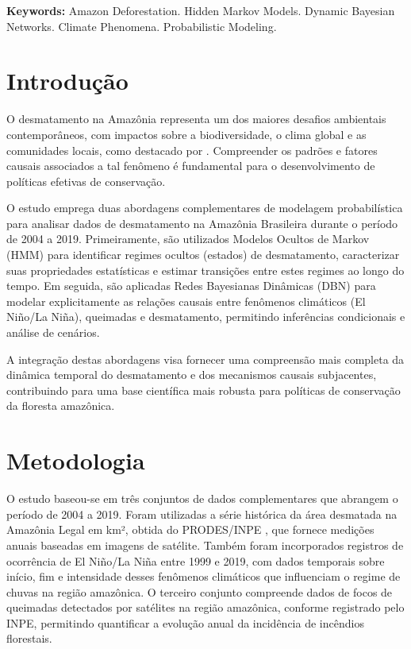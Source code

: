\documentclass[12pt,a4paper]{article}
\begin{document}
\noindent
\textbf{Keywords:} Amazon Deforestation. Hidden Markov Models. Dynamic Bayesian Networks. Climate Phenomena. Probabilistic Modeling.

\newpage

\section{Introdução}

O desmatamento na Amazônia representa um dos maiores desafios ambientais contemporâneos, com impactos sobre a biodiversidade, o clima global e as comunidades locais, como destacado por \citet{amazon}. Compreender os padrões e fatores causais associados a tal fenômeno é fundamental para o desenvolvimento de políticas efetivas de conservação. 

O estudo emprega duas abordagens complementares de modelagem probabilística para analisar dados de desmatamento na Amazônia Brasileira durante o período de 2004 a 2019. Primeiramente, são utilizados Modelos Ocultos de Markov (HMM) \citep{hmm} para identificar regimes ocultos (estados) de desmatamento, caracterizar suas propriedades estatísticas e estimar transições entre estes regimes ao longo do tempo. Em seguida, são aplicadas Redes Bayesianas Dinâmicas (DBN) \citep{dbn} para modelar explicitamente as relações causais entre fenômenos climáticos (El Niño/La Niña), queimadas e desmatamento, permitindo inferências condicionais e análise de cenários.

A integração destas abordagens visa fornecer uma compreensão mais completa da dinâmica temporal do desmatamento e dos mecanismos causais subjacentes, contribuindo para uma base científica mais robusta para políticas de conservação da floresta amazônica.

\section{Metodologia}

O estudo baseou-se em três conjuntos de dados complementares que abrangem o período de 2004 a 2019. Foram utilizadas a série histórica da área desmatada na Amazônia Legal em km², obtida do PRODES/INPE \citep{prodes}, que fornece medições anuais baseadas em imagens de satélite. Também foram incorporados registros de ocorrência de El Niño/La Niña entre 1999 e 2019, com dados temporais sobre início, fim e intensidade desses fenômenos climáticos que influenciam o regime de chuvas na região amazônica. O terceiro conjunto compreende dados de focos de queimadas detectados por satélites na região amazônica, conforme registrado pelo INPE, permitindo quantificar a evolução anual da incidência de incêndios florestais.
\end{document}
